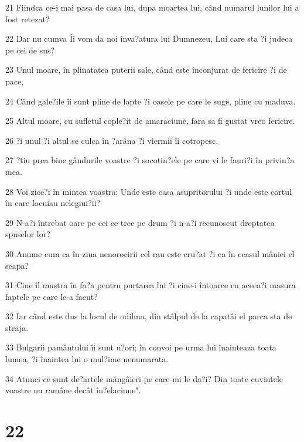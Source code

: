 \par 21 Fiindca ce-i mai pasa de casa lui, dupa moartea lui, când numarul lunilor lui a fost retezat?
\par 22 Dar nu cumva Îi vom da noi înva?atura lui Dumnezeu, Lui care sta ?i judeca pe cei de sus?
\par 23 Unul moare, în plinatatea puterii sale, când este înconjurat de fericire ?i de pace,
\par 24 Când gale?ile îi sunt pline de lapte ?i oasele pe care le suge, pline cu maduva.
\par 25 Altul moare, cu sufletul cople?it de amaraciune, fara sa fi gustat vreo fericire.
\par 26 ?i unul ?i altul se culca în ?arâna ?i viermii îi cotropesc.
\par 27 ?tiu prea bine gândurile voastre ?i socotin?ele pe care vi le fauri?i în privin?a mea.
\par 28 Voi zice?i în mintea voastra: Unde este casa asupritorului ?i unde este cortul în care locuiau nelegiui?ii?
\par 29 N-a?i întrebat oare pe cei ce trec pe drum ?i n-a?i recunoscut dreptatea spuselor lor?
\par 30 Anume cum ca în ziua nenorocirii cel rau este cru?at ?i ca în ceasul mâniei el scapa?
\par 31 Cine îl mustra în fa?a pentru purtarea lui ?i cine-i întoarce cu aceea?i masura faptele pe care le-a facut?
\par 32 Iar când este dus la locul de odihna, din stâlpul de la capatâi el parca sta de straja.
\par 33 Bulgarii pamântului îi sunt u?ori; în convoi pe urma lui înainteaza toata lumea, ?i înaintea lui o mul?ime nenumarata.
\par 34 Atunci ce sunt de?artele mângâieri pe care mi le da?i? Din toate cuvintele voastre nu ramâne decât în?elaciune".

\chapter{22}

